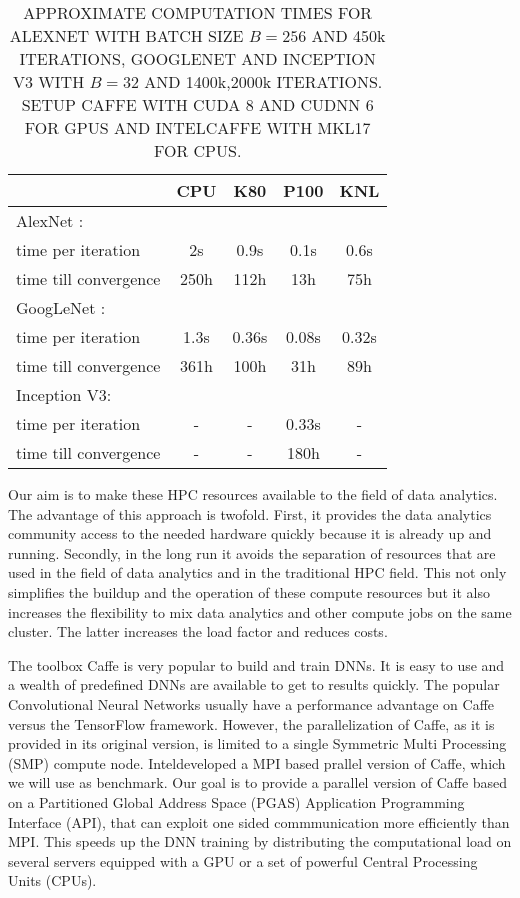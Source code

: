\documentclass[twoside,twocolumn]{article}
\begin{document}
\begin{table}[!t]
\caption{APPROXIMATE COMPUTATION TIMES FOR ALEXNET WITH BATCH SIZE $B=256$ AND
450k ITERATIONS, GOOGLENET AND INCEPTION V3 WITH $B=32$
AND 1400k,2000k ITERATIONS.
SETUP CAFFE WITH CUDA 8 AND CUDNN 6
FOR GPUS AND INTEL\texttrademark CAFFE WITH MKL17 FOR CPUS.}
\centering
\begin{tabular}{l|cccc}
 & CPU & K80 & P100 & KNL \\
\hline
AlexNet \cite{krizhevsky2012imagenet}:& & &  & \\
time per iteration & 2s & 0.9s & 0.1s & 0.6s \\
time till convergence & 250h & 112h & 13h & 75h \\
GoogLeNet \cite{szegedy2015going}:& & &  & \\
time per iteration & 1.3s& 0.36s & 0.08s & 0.32s \\
time till convergence & 361h & 100h & 31h  & 89h  \\
Inception V3:& & &  & \\
time per iteration & - &  - & 0.33s & - \\
time till convergence & - & - & 180h  & -  \\
\end{tabular}
\end{table}

Our aim is to make these HPC resources available to the field of
data analytics. The advantage of this approach is twofold. First,
it provides the data analytics community access to the needed hardware quickly
because it is already up and running. Secondly, in the long
run it avoids the separation of resources that are used in the field
of data analytics and in the traditional HPC field. This not only 
simplifies  the buildup and the operation of these compute resources but
it also increases the flexibility to mix data analytics and other 
compute jobs on the same cluster. The latter increases the load factor
and reduces costs.

The toolbox Caffe \cite{jia2014caffe} is very popular to build and train DNNs. It is easy
to use and a wealth of predefined DNNs are available to get to results
quickly. The popular Convolutional Neural Networks usually have
a performance advantage on Caffe versus the TensorFlow framework.
However, the parallelization of Caffe, as it is provided in its original
version, is limited to a single
Symmetric Multi Processing (SMP) compute node.
Intel\texttrademark developed a MPI based prallel version of Caffe, which
we will use as benchmark. 
Our goal is to provide a parallel version of Caffe based on a
Partitioned Global Address Space (PGAS)
Application Programming Interface (API),
that can exploit one sided commmunication more efficiently than MPI.
This speeds up the DNN training
by distributing the computational load on several servers equipped with
a GPU or a set of powerful Central Processing Units (CPUs). 
\end{document}
